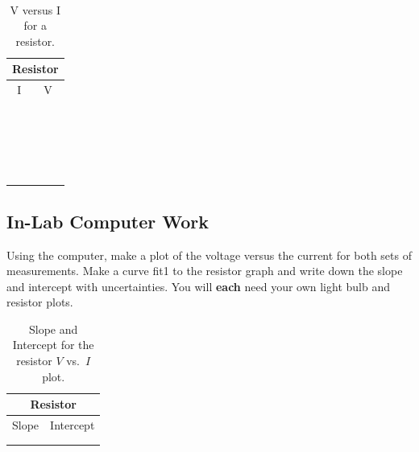 \ \\
\vspace*{2cm} 
\begin{table}[htb]
\begin{center}
\begin{tabular}{|c|c|}
\hline
\multicolumn{2}{|c|}{Resistor}\\
\hline
I & V \\
\hline
\hspace*{5cm} & \hspace*{5cm} \\
& \\
\hline
& \\
& \\
\hline
& \\
& \\
\hline
& \\
& \\
\hline
& \\
& \\
\hline
& \\
& \\
\hline
& \\
& \\
\hline
& \\
& \\
\hline
& \\
& \\
\hline
& \\
& \\
\hline
\end{tabular}
\end{center}
\caption{V versus I for a resistor.}
\label{tab:DC:resistor}
\end{table}
\vfill
\pagebreak
\subsection{In-Lab Computer Work}
Using the computer, make a plot of the voltage versus the current for both 
sets of measurements. Make a curve fit1 to the resistor graph and write
down the slope and intercept with uncertainties.  You will {\bf each} 
need your own light bulb and resistor plots.
\begin{table}[htb]
\begin{center}
\begin{tabular}{|c|c|}
\hline
\multicolumn{2}{|c|}{Resistor} \\
\hline
Slope & Intercept \\
\hline
\hspace*{5cm} & \hspace*{5cm} \\
& \\
\hline
\end{tabular}
\end{center}
\caption{Slope and Intercept for the resistor $V$ vs.\ $I$ plot.}
\end{table}



